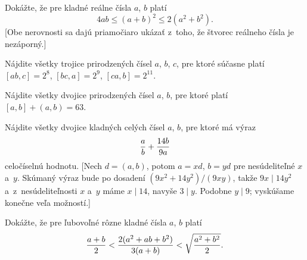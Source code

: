 {Dokážte, že pre kladné reálne čísla $a$, $b$ platí
$$
4ab\le (a+b)^2\le 2(a^2+b^2).
$$
[Obe nerovnosti sa dajú priamočiaro ukázať z~toho, že štvorec reálneho čísla je nezáporný.]

\D
Nájdite všetky trojice prirodzených čísel $a$, $b$, $c$, pre ktoré súčasne platí $[ab,c]=2^8$, $[bc,a]=2^9$, $[ca,b]=2^{11}$.
\vpravo{[50-C-S-1]}

Nájdite všetky dvojice prirodzených čísel $a$, $b$, pre ktoré platí $[a, b] + (a, b) = 63$.
\vpravo{[50-C-I-3]}

Nájdite všetky dvojice kladných celých čísel $a$, $b$, pre ktoré má výraz
$$
\displaystyle {a\over b}+{14b\over 9a}
$$
celočíselnú hodnotu.
[Nech $d=(a,b)$, potom $a=xd$, $b=yd$ pre nesúdeliteľné $x$ a~$y$. Skúmaný výraz bude po dosadení $(9x^2+14y^2)/(9xy)$, takže $9x\mid 14y^2$
a~z~nesúdeliteľnosti $x$ a~$y$ máme $x\mid 14$, navyše $3\mid y$. Podobne $y\mid 9$; vyskúšame konečne veľa možností.]

Dokážte, že pre ľubovoľné rôzne kladné čísla $a$, $b$ platí
$$
{a+b\over 2} < {2(a^2+ab+b^2)\over 3(a+b)} < \sqrt{a^2+b^2\over 2}.
$$
\vpravo{[58-C-I-6]}
}

